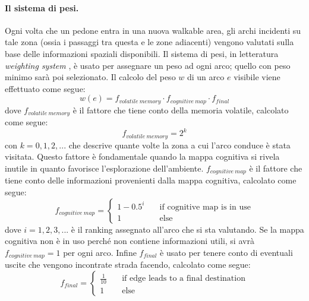 \documentclass[12pt,a4paper,openright,oneside]{book}
\begin{document}
\paragraph{Il sistema di pesi.} Ogni volta che un pedone entra in una nuova walkable area, gli archi incidenti su tale zona (ossia i passaggi tra questa e le zone adiacenti) vengono valutati sulla base delle informazioni spaziali disponibili. Il sistema di pesi, in letteratura \emph{weighting system} \cite{Andresen2018}, è usato per assegnare un peso ad ogni arco; quello con peso minimo sarà poi selezionato. Il calcolo del peso \(w\) di un arco \(e\) visibile viene effettuato come segue:
\begin{equation}\label{weighting-system}
w(e) = f_{volatile\ memory}\cdot f_{cognitive\ map}\cdot f_{final}
\end{equation}
dove \(f_{volatile\ memory}\) è il fattore che tiene conto della memoria volatile, calcolato come segue:
\begin{equation}
f_{volatile\ memory} = 2^{k}
\end{equation}
con \(k = 0,1,2,...\) che descrive quante volte la zona a cui l’arco conduce è stata visitata. Questo fattore è fondamentale quando la mappa cognitiva si rivela inutile in quanto favorisce l’esplorazione dell’ambiente. \(f_{cognitive\ map}\) è il fattore che tiene conto delle informazioni provenienti dalla mappa cognitiva, calcolato come segue:
\begin{equation}
f_{cognitive\ map} =
  \begin{cases}
    1 - 0.5^i     & \quad \text{if cognitive map is in use}\\
    1             & \quad \text{else}
  \end{cases}
\end{equation}
dove \(i = 1,2,3,...\) è il ranking assegnato all'arco che si sta valutando. Se la mappa cognitiva non è in uso perché non contiene informazioni utili, si avrà \(f_{cognitive\ map} = 1\) per ogni arco. Infine \(f_{final}\) è usato per tenere conto di eventuali uscite che vengono incontrate strada facendo, calcolato come segue: 
\begin{equation}
f_{final} =
  \begin{cases}
    \frac{1}{10}       & \quad \text{if edge leads to a final destination}\\
    1                  & \quad \text{else}
  \end{cases}
\end{equation}
\end{document}
